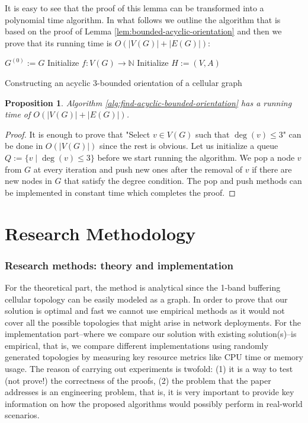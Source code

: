 \documentclass[letterpaper, 10 pt, conference]{ieeeconf}  %
\newtheorem{prop}{Proposition}
\begin{document}
It is easy to see that the proof of this lemma can be transformed into a polynomial time algorithm. In what follows we outline the algorithm that is based on the proof of Lemma \ref{lem:bounded-acyclic-orientation} and then we prove that its running time is $O(|V(G)| + |E(G)|)$:
\begin{algorithm}\label{alg:find-acyclic-bounded-orientation}
 $G^{(0)} := G$\;
 Initialize $f \colon V(G) \to \mathbb{N}$\;
 Initialize $H:=(V,A)$\;
 \caption{Constructing an acyclic $3$-bounded orientation of a cellular graph}
\end{algorithm}
\begin{prop} Algorithm \ref{alg:find-acyclic-bounded-orientation} has a running time of $O(|V(G)| + |E(G)|)$.
\end{prop}
\begin{proof}
It is enough to prove that "Select $v \in V(G)$ such that $\deg(v) \leqslant 3$" can be done in $O(|V(G)|)$ since the rest is obvious. Let us initialize a queue $Q := \lbrace v \mid \deg(v) \leqslant  3\rbrace$ before we start running the algorithm. We pop a node $v$ from $G$ at every iteration and push new ones after the removal of $v$ if there are new nodes in $G$ that satisfy the degree condition. The pop and push methods can be implemented in constant time which completes the proof.
\end{proof}


\section{Research Methodology}
\subsubsection*{Research methods: theory and implementation}
For the theoretical part, the method is analytical since the 1-band buffering cellular topology can be easily modeled as a graph. In order
to prove that our solution is optimal and fast we cannot use empirical methods as it would not cover all the possible
topologies that might arise in network deployments. For the implementation part\---where we compare our solution with existing solution(s)\---is empirical, that is, we compare different implementations using randomly generated topologies by measuring key resource metrics like CPU time or memory usage. The reason of carrying out experiments is twofold: (1) it is a way to test (not prove!) the correctness of the proofs, (2) the problem that the paper addresses is an engineering problem, that is, it is very important to provide key information on how the proposed algorithms would possibly perform in real-world scenarios.
\end{document}
